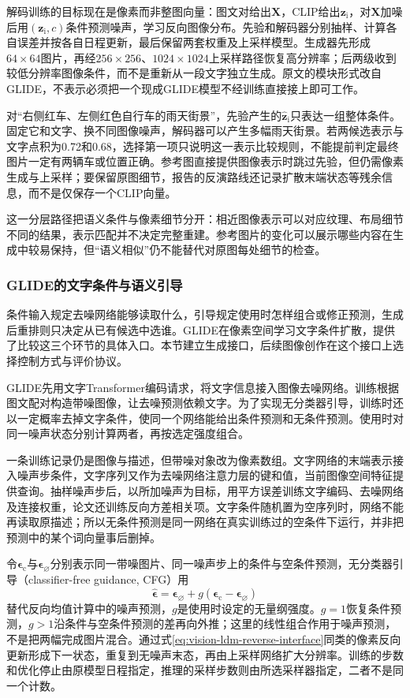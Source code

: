 解码训练的目标现在是像素而非整图向量：图文对给出$\bm X$，CLIP给出$\bm z_{\mathrm i}$，对$\bm X$加噪后用$(\bm z_{\mathrm i},c)$条件预测噪声，学习反向图像分布。先验和解码器分别抽样、计算各自误差并按各自日程更新，最后保留两套权重及上采样模型。生成器先形成$64\times64$图片，再经$256\times256$、$1024\times1024$上采样路径恢复高分辨率；后两级收到较低分辨率图像条件，而不是重新从一段文字独立生成。原文的模块形式改自GLIDE，不表示必须把一个现成GLIDE模型不经训练直接接上即可工作。

对“右侧红车、左侧红色自行车的雨天街景”，先验产生的$\widehat{\bm z}_{\mathrm i}$只表达一组整体条件。固定它和文字、换不同图像噪声，解码器可以产生多幅雨天街景。若两候选表示与文字点积为0.72和0.68，选择第一项只说明这一表示比较规则，不能提前判定最终图片一定有两辆车或位置正确。参考图直接提供图像表示时跳过先验，但仍需像素生成与上采样；要保留原图细节，报告的反演路线还记录扩散末端状态等残余信息，而不是仅保存一个CLIP向量。

这一分层路径把语义条件与像素细节分开：相近图像表示可以对应纹理、布局细节不同的结果，表示匹配并不决定完整重建。参考图片的变化可以展示哪些内容在生成中较易保持，但“语义相似”仍不能替代对原图每处细节的检查。

\subsubsection{GLIDE的文字条件与语义引导}
\label{sec:vision-models-glide}

条件输入规定去噪网络能够读取什么，引导规定使用时怎样组合或修正预测，生成后重排则只决定从已有候选中选谁。GLIDE在像素空间学习文字条件扩散，提供了比较这三个环节的具体入口。本节建立生成接口，后续图像创作在这个接口上选择控制方式与评价协议。

GLIDE先用文字Transformer编码请求，将文字信息接入图像去噪网络。训练根据图文配对构造带噪图像，让去噪预测依赖文字。为了实现无分类器引导，训练时还以一定概率去掉文字条件，使同一个网络能给出条件预测和无条件预测。使用时对同一噪声状态分别计算两者，再按选定强度组合。

一条训练记录仍是图像与描述，但带噪对象改为像素数组。文字网络的末端表示接入噪声步条件，文字序列又作为去噪网络注意力层的键和值，当前图像空间特征提供查询。抽样噪声步后，以所加噪声为目标，用平方误差训练文字编码、去噪网络及连接权重，论文还训练反向方差相关项。文字条件随机置为空序列时，网络不能再读取原描述；所以无条件预测是同一网络在真实训练过的空条件下运行，并非把预测中的某个词向量事后删掉。

令$\bm\epsilon_{\mathrm c}$与$\bm\epsilon_{\varnothing}$分别表示同一带噪图片、同一噪声步上的条件与空条件预测，无分类器引导（classifier-free guidance, CFG）用
\begin{equation}
  \widehat{\bm\epsilon}
     =\bm\epsilon_{\varnothing}
        +g(\bm\epsilon_{\mathrm c}-\bm\epsilon_{\varnothing})
  \label{eq:vision-glide-cfg-interface}
\end{equation}
替代反向均值计算中的噪声预测，$g$是使用时设定的无量纲强度。$g=1$恢复条件预测，$g>1$沿条件与空条件预测的差再向外推；这里的线性组合作用于噪声预测，不是把两幅完成图片混合。通过式\eqref{eq:vision-ldm-reverse-interface}同类的像素反向更新形成下一状态，重复到无噪声末态，再由上采样网络扩大分辨率。训练的步数和优化停止由原模型日程指定，推理的采样步数则由所选采样器指定，二者不是同一个计数。

